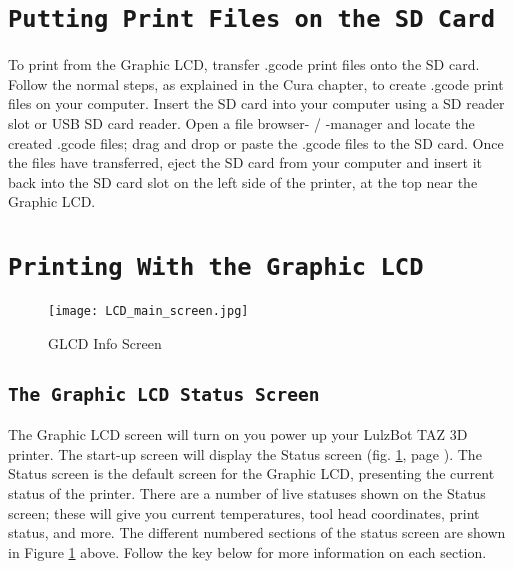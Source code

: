 \section{\texttt{Putting Print Files on the SD Card}}
To print from the Graphic LCD, transfer .gcode print files onto the SD card. Follow the normal steps, as explained in the Cura chapter, to create .gcode print files on your computer. Insert the SD card into your computer using a SD reader slot or USB SD card reader. Open a file browser- / -manager and locate the created .gcode files; drag and drop or paste the .gcode files to the SD card. Once the files have transferred, eject the SD card from your computer and insert it back into the SD card slot on the left side of the printer, at the top near the Graphic LCD.

\section{\texttt{Printing With the Graphic LCD}}
\begin{figure}[b]
\centering
\texttt{[image: LCD\_main\_screen.jpg]}
\caption{GLCD Info Screen}
\label{fig:info_screen}
\end{figure}

\subsection{\texttt{The Graphic LCD Status Screen}}
The Graphic LCD screen will turn on you power up your LulzBot TAZ 3D printer. The start-up screen will display the Status screen (fig. \ref{fig:info_screen}, page \pageref{fig:info_screen}). The Status screen is the default screen for the Graphic LCD, presenting the current status of the printer. There are a number of live statuses shown on the Status screen; these will give you current temperatures, tool head coordinates, print status, and more. The different numbered sections of the status screen are shown in Figure \ref{fig:info_screen} above. Follow the key below for more information on each section.

